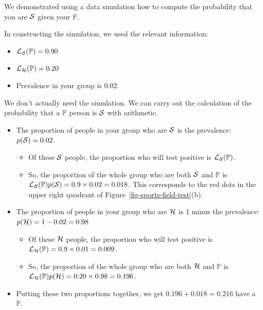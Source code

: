 \documentclass[
  letterpaper,
  DIV=11,
  numbers=noendperiod,
  oneside]{scrartcl}
\providecommand{\tightlist}{%
  \setlength{\itemsep}{0pt}\setlength{\parskip}{0pt}}\usepackage{longtable,booktabs,array}
\begin{document}
\begin{tcolorbox}[enhanced jigsaw, colbacktitle=quarto-callout-note-color!10!white, opacityback=0, breakable, opacitybacktitle=0.6, colback=white, coltitle=black, arc=.35mm, title=\textcolor{quarto-callout-note-color}{\faInfo}\hspace{0.5em}{Arithmetic calculation}, left=2mm, colframe=quarto-callout-note-color-frame, rightrule=.15mm, bottomrule=.15mm, leftrule=.75mm, bottomtitle=1mm, toptitle=1mm, titlerule=0mm, toprule=.15mm]

We demonstrated using a data simulation how to compute the probability
that you are \({\cal S}\) given your \({\mathbb{P}}\).

In constructing the simulation, we used the relevant information:

\begin{itemize}
\tightlist
\item
  \({\cal L}_{\cal S}({\mathbb{P}}) = 0.90\)
\item
  \({\cal L}_{\cal H}({\mathbb{P}}) = 0.20\)
\item
  Prevalence in your group is 0.02.
\end{itemize}

We don't actually need the simulation. We can carry out the calculation
of the probability that a \({\mathbb{P}}\) person is \({\cal S}\) with
arithmetic.

\begin{itemize}
\tightlist
\item
  The proportion of people in your group who are \({\cal S}\) is the
  prevalence: \(p({\cal S}) = 0.02\).

  \begin{itemize}
  \tightlist
  \item
    Of these \({\cal S}\) people, the proportion who will test positive
    is \({\cal L}_{\cal S}({\mathbb{P}})\).
  \item
    So, the proportion of the whole group who are both \({\cal S}\) and
    \({\mathbb{P}}\) is
    \({\cal L}_{\cal S}({\mathbb{P}}) p({\cal S}) = 0.9 \times 0.02 = 0.018\).
    This corresponds to the red dots in the upper right quadrant of
    Figure~\ref{fig-sports-field-test}(b).
  \end{itemize}
\item
  The proportion of people in your group who are \({\cal H}\) is 1 minus
  the prevalence: \(p({\cal H}) = 1 - 0.02 = 0.98\)

  \begin{itemize}
  \tightlist
  \item
    Of these \({\cal H}\) people, the proportion who will test positive
    is \({\cal L}_{\cal H}({\mathbb{P}}) = 0.9 \times 0.01 = 0.009\).
  \item
    So, the proportion of the whole group who are both \({\cal H}\) and
    \({\mathbb{P}}\) is
    \({\cal L}_{\cal H}({\mathbb{P}}) p({\cal H}) = 0.20 \times 0.98 = 0.196\).
  \end{itemize}
\item
  Putting these two proportions together, we get
  \(0.196 + 0.018 = 0.216\) have a \({\mathbb{P}}\).
\end{itemize}


\end{tcolorbox}
\end{document}

